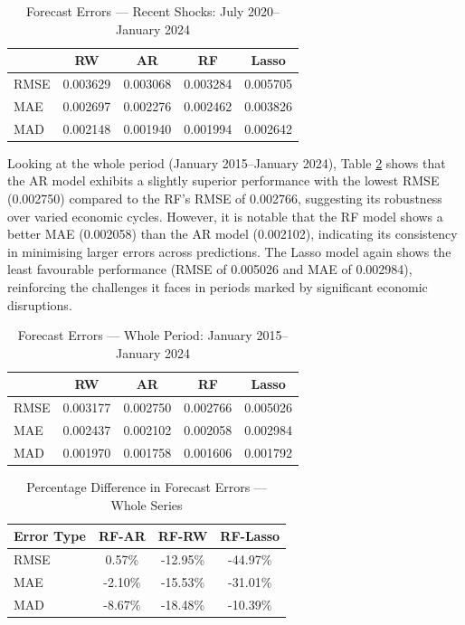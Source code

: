 \begin{table}[H]
\centering
\caption{Forecast Errors — Recent Shocks: July 2020–January 2024} \label{tab:errors_post}
\begin{tabular}{lcccc}
\toprule
& RW & AR & RF & Lasso \\
\midrule
RMSE & 0.003629 & 0.003068 & 0.003284 & 0.005705 \\
MAE  & 0.002697 & 0.002276 & 0.002462 & 0.003826 \\
MAD  & 0.002148 & 0.001940 & 0.001994 & 0.002642 \\
\bottomrule
\end{tabular}
\end{table}



Looking at the whole period (January 2015–January 2024), Table \ref{tab:errors_whole} shows that the AR model exhibits a slightly superior performance with the lowest RMSE (0.002750) compared to the RF's RMSE of 0.002766, suggesting its robustness over varied economic cycles. However, it is notable that the RF model shows a better MAE (0.002058) than the AR model (0.002102), indicating its consistency in minimising larger errors across predictions. The Lasso model again shows the least favourable performance (RMSE of 0.005026 and MAE of 0.002984), reinforcing the challenges it faces in periods marked by significant economic disruptions.


\begin{table}[H]
\centering
\caption{Forecast Errors — Whole Period: January 2015–January 2024} \label{tab:errors_whole}
\begin{tabular}{lcccc}
\toprule
& RW & AR & RF & Lasso \\
\midrule
RMSE & 0.003177 & 0.002750 & 0.002766 & 0.005026 \\
MAE  & 0.002437 & 0.002102 & 0.002058 & 0.002984 \\
MAD  & 0.001970 & 0.001758 & 0.001606 & 0.001792 \\
\bottomrule
\end{tabular}
\end{table}


\begin{table}[H]
\centering
\caption{Percentage Difference in Forecast Errors — Whole Series} \label{tab:diff_whole}
\begin{tabular}{lccc}
\toprule
Error Type & RF-AR & RF-RW & RF-Lasso \\
\midrule
RMSE & 0.57\% & -12.95\% & -44.97\% \\
MAE  & -2.10\% & -15.53\% & -31.01\% \\
MAD  & -8.67\% & -18.48\% & -10.39\% \\
\bottomrule
\end{tabular}
\end{table}



